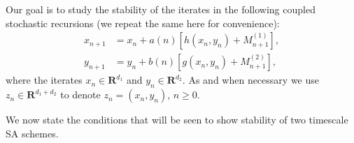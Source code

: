 Our goal is to study the stability of the iterates in the following coupled stochastic recursions (we repeat the same here for convenience):
\begin{subequations}\label{ttsarec}
\begin{align}
\label{fast}x_{n+1}&=x_n+a(n)[h(x_n,y_n)+M^{(1)}_{n+1}],\\
\label{slow}y_{n+1}&=y_n+b(n)[g(x_n,y_n)+M^{(2)}_{n+1}],
\end{align}
\end{subequations}
where the iterates $x_n \in \mathbf{R}^{d_1}$ and $y_n \in \mathbf{R}^{d_2}$. As and when necessary we use 
$z_n \in \mathbf{R}^{d_1+d_2}$ to denote $z_n=(x_n,y_n)$, $n\geq 0$. 
\begin{comment}
We now define certain $\emph{scaled}$ functions, since we would require them in our analysis. 
\begin{definition}
\mbox{ }\\
\begin{enumerate}
\item Define $h^f_c \colon \R^{d+k} \ra \R^d$, such that $h^f_c(x,y)\stackrel{def}{=}\frac{h(cx,y)}{c}, c\geq 1$.
\item Define $h^s_c \colon \R^{d+k} \ra \R^k$, such that $h^f_c(x,y)\stackrel{def}{=}\frac{h(cx,cy)}{c}, c\geq 1$. 
\item Define $g_c \colon \R^{d+k} \ra \R^{k}$, such that $g_c(x,y)\stackrel{def}{=}\frac{g(cx,cy)}{c}, c\geq 1$.
\end{enumerate}
\end{definition}
\begin{lemma}\label{lipschitz}
The maps  $h^f_c$, $h^s_c$ and $g_c$ , are Lipschitz continuous.
\end{lemma}
\begin{proof}
See Appendix.
\end{proof}\\
\end{comment}
We now state the conditions that will be seen to show stability of two timescale SA schemes.
